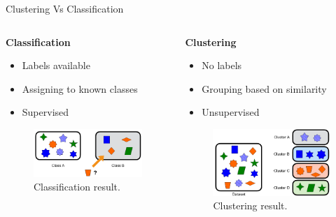 \begin{frame}[allowframebreaks]{Clustering Vs Classification}
\begin{columns}
    \begin{column}{0.5\textwidth}
        \textbf{Classification}
        \begin{itemize}
            \item Labels available
            \item Assigning to known classes
            \item Supervised
        \end{itemize}
        \vspace{1.8em}
        \begin{figure}
            \centering
            \includegraphics[width=1\textwidth,keepaspectratio]{images/sample-result-classification.png}
            \caption{Classification result.}
        \end{figure}
    \end{column}
    \begin{column}{0.5\textwidth}
        \textbf{Clustering}
        \begin{itemize}
            \item No labels
            \item Grouping based on similarity
            \item Unsupervised
        \end{itemize}
        \vspace{1.8em}
        \begin{figure}
            \centering
            \includegraphics[width=1\textwidth,keepaspectratio]{images/sample-result-clustering.png}
            \caption{Clustering result.}
        \end{figure}
    \end{column}
\end{columns}
\end{frame}

